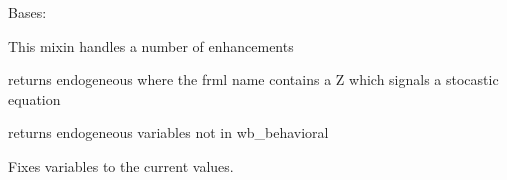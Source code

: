 \documentclass[letterpaper,10pt,english]{sphinxmanual}
\begin{document}
\begin{fulllineitems}
\label{\detokenize{core/modelclass:modelclass.WB_Mixin}}
\pysigstartsignatures
{}
\pysigstopsignatures
\sphinxAtStartPar
Bases: 

\sphinxAtStartPar
This mixin handles a number of enhancements

\begin{fulllineitems}
\label{\detokenize{core/modelclass:modelclass.WB_Mixin.wb_behavioral}}
\pysigstartsignatures
{}
\pysigstopsignatures
\sphinxAtStartPar
returns endogeneous where the frml name contains a Z which signals a stocastic equation

\end{fulllineitems}


\begin{fulllineitems}
\label{\detokenize{core/modelclass:modelclass.WB_Mixin.wb_ident}}
\pysigstartsignatures
{}
\pysigstopsignatures
\sphinxAtStartPar
returns endogeneous variables not in wb\_behavioral

\end{fulllineitems}


\begin{fulllineitems}
\label{\detokenize{core/modelclass:modelclass.WB_Mixin.fix}}
\pysigstartsignatures
{}
\pysigstopsignatures
\sphinxAtStartPar
Fixes variables to the current values.


\end{fulllineitems}
\end{fulllineitems}
\end{document}
